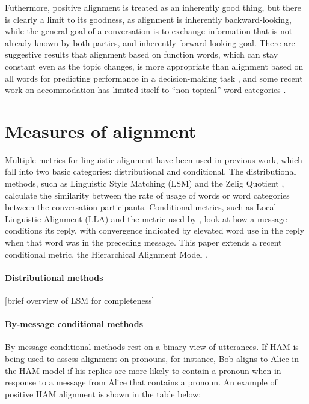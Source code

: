 \documentclass[11pt]{article}
\begin{document}
Futhermore, positive alignment is treated as an inherently good thing, but there is clearly a limit to its goodness, as alignment is inherently backward-looking, while the general goal of a conversation is to exchange information that is not already known by both parties, and inherently forward-looking goal. There are suggestive results that alignment based on function words, which can stay constant even as the topic changes, is more appropriate than alignment based on all words for predicting performance in a decision-making task \cite{FusaroliEtAl2012}, and some recent work on accommodation has limited itself to ``non-topical'' word categories \cite{DNMGamonDumais2011,DoyleYurovskyFrank2016}.  

\section{Measures of alignment}
Multiple metrics for linguistic alignment have been used in previous work, which fall into two basic categories: distributional and conditional. The distributional methods, such as Linguistic Style Matching (LSM) \cite{NiederhofferPennebaker2002,IrelandEtAl2011} and the Zelig Quotient \cite{JonesEtAl2014}, calculate the similarity between the rate of usage of words or word categories between the conversation participants. Conditional metrics, such as Local Linguistic Alignment (LLA) \cite{FusaroliEtAl2012,WangReitterYen2014} and the metric used by \cite{DNMGamonDumais2011}, look at how a message conditions its reply, with convergence indicated by elevated word use in the reply when that word was in the preceding message. This paper extends a recent conditional metric, the Hierarchical Alignment Model \cite{DoyleYurovskyFrank2016}.

\paragraph{Distributional methods} [brief overview of LSM for completeness]


\paragraph{By-message conditional methods} By-message conditional methods rest on a binary view of utterances. If HAM is being used to assess alignment on pronouns, for instance, Bob aligns to Alice in the HAM model if his replies are more likely to contain a pronoun when in response to a message from Alice that contains a pronoun. An example of positive HAM alignment is shown in the table below:
\end{document}
